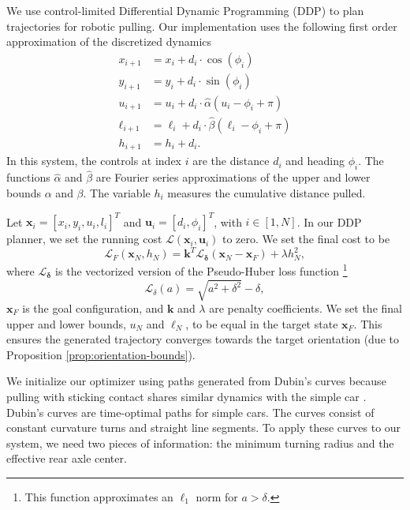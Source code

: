 \documentclass[conference]{IEEEtran}
\begin{document}
We use control-limited Differential Dynamic Programming (DDP)
\cite{tassa2014control} to plan trajectories for robotic pulling.  Our
implementation uses the following first order approximation of the
discretized dynamics
\begin{align}
  x_{i+1} &= x_i + d_i\cdot\cos(\phi_i) \\
  y_{i+1} &= y_i + d_i\cdot\sin(\phi_i)\\
  u_{i+1} &= u_i + d_i\cdot\hat{\alpha}(u_i - \phi_i + \pi) \\
  \ell_{i+1} &= \ell_i + d_i\cdot\hat{\beta}(\ell_i - \phi_i + \pi)\\
  h_{i+1} &= h_i + d_i.
\end{align}
In this system, the controls at index $i$ are the distance $d_i$ and
heading $\phi_i$. The functions $\hat{\alpha}$ and $\hat{\beta}$ are
Fourier series approximations of the upper and lower bounds $\alpha$
and $\beta$. The variable $h_i$ measures the cumulative distance
pulled.

Let $\mathbf{x}_i = [x_i,y_i,u_i,l_i]^T$ and
$\mathbf{u}_i = [d_i,\phi_i]^T$, with $i\in[1,N]$. In our DDP planner,
we set the running cost $\mathcal{L}(\mathbf{x}_i,\mathbf{u}_i)$ to
zero. We set the final cost to be
\begin{equation}
\mathcal{L}_F(\mathbf{x}_N,h_N) = \mathbf{k}^T\mathcal{L}_{\bm{\delta}}(\mathbf{x}_N-\mathbf{x}_F) + \lambda h_N^2,
\end{equation}
where $\mathcal{L}_{\bm{\delta}}$ is the vectorized version of the
Pseudo-Huber loss function \footnote{This function approximates an
  $\ell_1$ norm for $a > \delta$.}
\begin{equation}
\mathcal{L}_{\delta}(a) = \sqrt{a^2+\delta^2}-\delta,
\end{equation}
$\mathbf{x}_F$ is the goal configuration, and $\mathbf{k}$ and
$\lambda$ are penalty coefficients. We set the final upper and lower
bounds, $u_N$ and $\ell_N$, to be equal in the target state
$\mathbf{x}_F$. This ensures the generated trajectory converges
towards the target orientation (due to Proposition \ref{prop:orientation-bounds}).

We initialize our optimizer using paths generated from Dubin's curves
\cite{dubins1957curves} because pulling with sticking contact shares
similar dynamics with the simple car \cite{lavalle1999planning}.
Dubin's curves are time-optimal paths for simple cars. The curves
consist of constant curvature turns and straight line segments. To
apply these curves to our system, we need two pieces of information:
the minimum turning radius and the effective rear axle center. 
\end{document}
